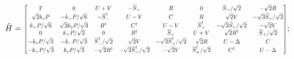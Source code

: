 \documentclass[../main.tex]{subfiles}
\newcommand{\kp}{k_{+}}
\newcommand{\km}{k_{-}}
\newcommand{\kz}{k_{z}}
\newcommand{\stp}{\overline{S}_{+}}
\newcommand{\stm}{\overline{S}_{-}}
\newcommand{\swp}{\widetilde{S}_{+}}
\newcommand{\swm}{\widetilde{S}_{-}}
\begin{document}
    \begin{equation}
        \hat{H} =
            \rmatrix[0.7]{
                T       &   0     & U + V & -\stm & R &   0   & \stm / \sqrt{2}   & -\sqrt{2} R\\
                \sqrt{2} \kz P  & -\km P /\sqrt{6}  &   -\stm^\dagger   & U-V   &   C   &   R   & \sqrt{2} V & -\sqrt{3} \swm /\sqrt{2}\\
                \kp P /\sqrt{6} & \sqrt{2} \kz P /\sqrt{3}  & R^\dagger & C^\dagger & U - V & \stp^\dagger  & - \sqrt{3} \swp /\sqrt{2} & - \sqrt{2} V\\
                0   &   \kp P /\sqrt{2} & 0 & R^\dagger & \stp  & U+V   & \sqrt{2} R^\dagger    & \stp/\sqrt{2}\\
                -\kz P /\sqrt{3}    & - \km P / \sqrt{3}    & \stm^\dagger /\sqrt{2}    & \sqrt{2} V    & - \sqrt{3} \stp^\dagger /\sqrt{2} & \sqrt{2} R    & U - \Delta    & C\\
                -\kp P /\sqrt{3}    & \kz P /\sqrt{3}   & - \sqrt{2} R^\dagger  & -\sqrt{3} \stm^\dagger /\sqrt{2}  & -\sqrt{2} V   & \stp^\dagger /\sqrt{2}    & C^\dagger & U - \Delta
            };
    \end{equation}
\end{document}

